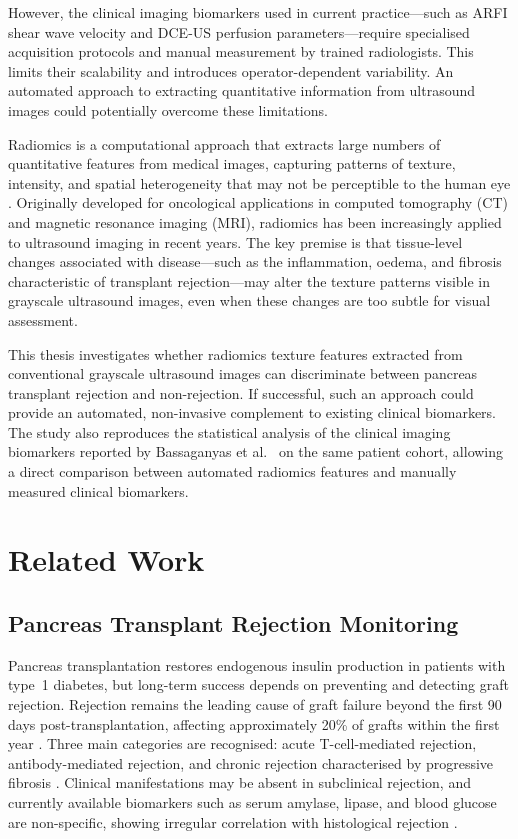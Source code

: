 However, the clinical imaging biomarkers used in current practice---such as ARFI shear wave velocity and DCE-US perfusion parameters---require specialised acquisition protocols and manual measurement by trained radiologists. This limits their scalability and introduces operator-dependent variability. An automated approach to extracting quantitative information from ultrasound images could potentially overcome these limitations.

Radiomics is a computational approach that extracts large numbers of quantitative features from medical images, capturing patterns of texture, intensity, and spatial heterogeneity that may not be perceptible to the human eye \cite{lambin2012, gillies2016}. Originally developed for oncological applications in computed tomography (CT) and magnetic resonance imaging (MRI), radiomics has been increasingly applied to ultrasound imaging in recent years. The key premise is that tissue-level changes associated with disease---such as the inflammation, oedema, and fibrosis characteristic of transplant rejection---may alter the texture patterns visible in grayscale ultrasound images, even when these changes are too subtle for visual assessment.

This thesis investigates whether radiomics texture features extracted from conventional grayscale ultrasound images can discriminate between pancreas transplant rejection and non-rejection. If successful, such an approach could provide an automated, non-invasive complement to existing clinical biomarkers. The study also reproduces the statistical analysis of the clinical imaging biomarkers reported by Bassaganyas et al.\ \cite{bassaganyas2025} on the same patient cohort, allowing a direct comparison between automated radiomics features and manually measured clinical biomarkers.

\section{Related Work}

\subsection{Pancreas Transplant Rejection Monitoring}

Pancreas transplantation restores endogenous insulin production in patients with type~1 diabetes, but long-term success depends on preventing and detecting graft rejection. Rejection remains the leading cause of graft failure beyond the first 90 days post-transplantation, affecting approximately 20\% of grafts within the first year \cite{niederhaus2013, white2009}. Three main categories are recognised: acute T-cell-mediated rejection, antibody-mediated rejection, and chronic rejection characterised by progressive fibrosis \cite{niederhaus2013, drachenberg2008}. Clinical manifestations may be absent in subclinical rejection, and currently available biomarkers such as serum amylase, lipase, and blood glucose are non-specific, showing irregular correlation with histological rejection \cite{redfield2015}.

